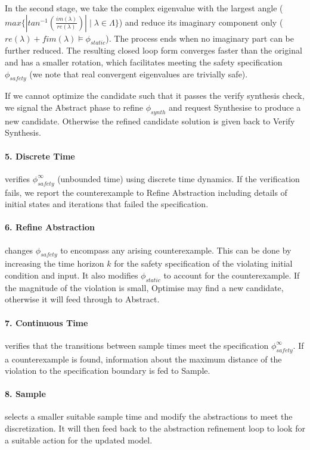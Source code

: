 \documentclass[sigconf]{llncs}
\begin{document}
In the second stage, we take the complex eigenvalue
with the largest angle ($max\{|tan^{-1}\left(\frac{im(\lambda)}{re(\lambda)}\right)| \mid \lambda \in \Lambda\}$)
and reduce its imaginary component only  ($re(\lambda) + f im(\lambda) \models \phi_{static}$).
The process ends when no imaginary part can be further reduced.
The resulting closed loop form converges faster than the original and has a
smaller rotation, which facilitates meeting the safety specification $\phi_{safety}$
(we note that real convergent eigenvalues are trivially safe).

If we cannot optimize the candidate such that it passes the {\sc
  verify synthesis} check, we signal the {\sc Abstract} phase to
refine $\phi_{synth}$ and request {\sc Synthesise} to produce a new
candidate.  Otherwise the refined candidate solution is given back to
{\sc Verify Synthesis}.
%
\paragraph{5. {\sc Discrete Time}} verifies $\phi_{safety}^{\infty}$ (unbounded time)
using discrete time dynamics.  If the verification fails, we report the
counterexample to {\sc Refine Abstraction} including details of initial states
and iterations that failed the specification.  
\paragraph{6. {\sc Refine Abstraction}} changes $\phi_{safety}$ to encompass any arising
counterexample.  This can be done by increasing the time horizon $k$ for the
safety specification of the violating initial condition and input.
It also modifies $\phi_{static}$ to account for the counterexample.
If the magnitude of the violation is small, {\sc Optimise} may find a new
candidate, otherwise it will feed through to {\sc Abstract}.
%
\paragraph{7. {\sc Continuous Time}} verifies that the
transitions between sample times meet the specification $\phi_{safety}^{\infty}$.  If
a counterexample is found, information about the maximum distance of the
violation to the specification boundary is fed to {\sc Sample}. 
\paragraph{8. {\sc Sample}} selects a smaller suitable sample time and modify the abstractions to meet the discretization. 
It will then feed back to the abstraction refinement loop to look for a suitable action for the updated model.
%
\end{document}
